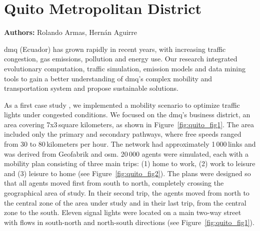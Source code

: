 \chapter{Quito Metropolitan District}
\label{ch:quito}
\hfill \textbf{Authors:} Rolando Armas, Hernán Aguirre



\gls{dmq} (Ecuador) has grown rapidly in recent years, with increasing traffic congestion, gas emissions, pollution and energy use. Our research integrated evolutionary computation, traffic simulation, emission models and data mining tools to gain a better understanding of \gls{dmq}’s complex mobility and transportation system and propose sustainable solutions.

As a first case study \citep[][]{ArmasEtAl_SEAL_2014}, we implemented a mobility scenario to optimize traffic lights under congested conditions. We focused on the
\gls{dmq}’s business district, an area covering 7x3\,square kilometers, as shown in Figure~\ref{fig:quito_fig1}. The area included only the primary and secondary pathways, where free speeds ranged from 30 to 80\,kilometers per hour. The network had approximately 1\,000\,links and was derived from Geofabrik and \gls{osm}. 20\,000 agents were simulated, each with a mobility plan consisting of three main trips: (1) home to work, (2) work to leisure and (3) leisure to home (see Figure~\ref{fig:quito_fig2}). The plans were designed so that all agents moved first from south to north, completely crossing the geographical area of study. In their second trip, the agents moved from north to the central zone of the area under study and in their last trip, from the central zone to the south. Eleven signal lights were located on a main two-way street with flows in south-north and north-south directions (see Figure~\ref{fig:quito_fig1}).

